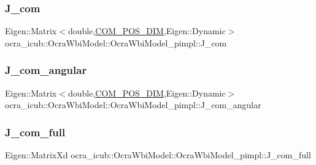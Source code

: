 \hypertarget{structOcraWbiModel_1_1OcraWbiModel__pimpl_ab724e92a7f74f03c3842f22129b2ad94}{}\label{structOcraWbiModel_1_1OcraWbiModel__pimpl_ab724e92a7f74f03c3842f22129b2ad94} 
\subsubsection{\texorpdfstring{J\+\_\+com}{J\_com}}
{\footnotesize\ttfamily Eigen\+::\+Matrix$<$double,\hyperlink{OcraWbiModel_8cpp_a72cb22de2538ae949cc73fa3d7c33bdc}{C\+O\+M\+\_\+\+P\+O\+S\+\_\+\+D\+IM},Eigen\+::\+Dynamic$>$ ocra\+\_\+icub\+::\+Ocra\+Wbi\+Model\+::\+Ocra\+Wbi\+Model\+\_\+pimpl\+::\+J\+\_\+com}

\hypertarget{structOcraWbiModel_1_1OcraWbiModel__pimpl_a1755993b2e425c6a49c55874c6c455e4}{}\label{structOcraWbiModel_1_1OcraWbiModel__pimpl_a1755993b2e425c6a49c55874c6c455e4} 
\subsubsection{\texorpdfstring{J\+\_\+com\+\_\+angular}{J\_com\_angular}}
{\footnotesize\ttfamily Eigen\+::\+Matrix$<$double,\hyperlink{OcraWbiModel_8cpp_a72cb22de2538ae949cc73fa3d7c33bdc}{C\+O\+M\+\_\+\+P\+O\+S\+\_\+\+D\+IM},Eigen\+::\+Dynamic$>$ ocra\+\_\+icub\+::\+Ocra\+Wbi\+Model\+::\+Ocra\+Wbi\+Model\+\_\+pimpl\+::\+J\+\_\+com\+\_\+angular}

\hypertarget{structOcraWbiModel_1_1OcraWbiModel__pimpl_a73c9391019a2e36ddd2c2f9ef1773a41}{}\label{structOcraWbiModel_1_1OcraWbiModel__pimpl_a73c9391019a2e36ddd2c2f9ef1773a41} 
\subsubsection{\texorpdfstring{J\+\_\+com\+\_\+full}{J\_com\_full}}
{\footnotesize\ttfamily Eigen\+::\+Matrix\+Xd ocra\+\_\+icub\+::\+Ocra\+Wbi\+Model\+::\+Ocra\+Wbi\+Model\+\_\+pimpl\+::\+J\+\_\+com\+\_\+full}

